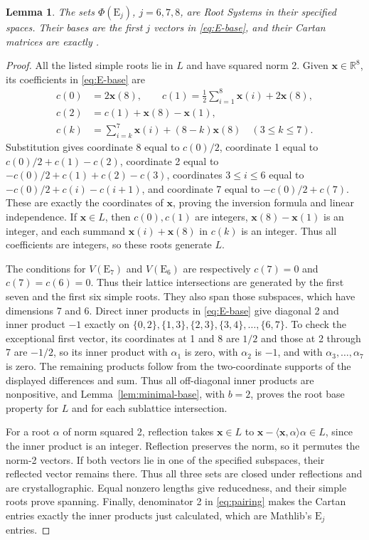 \documentclass[11pt]{amsart}
\newcommand\re{{\mathbb R}}%
\newcommand\Zx{{\mathbf x}}
\newcommand\ip[2]{\langle#1,#2\rangle}
\newtheorem{lemma}[theorem]{Lemma}
\theoremstyle{definition}
\newcommand{\typ}[1]{\mathrm{#1}}
\DeclareRobustCommand{\ml}[1]{\ifmmode\text{\normalfont\small\ttfamily\detokenize{#1}}\else{\normalfont\small\nolinkurl{#1}}\fi}
\begin{document}
\begin{lemma}\label{lem:E}
The sets $\Phi(\typ E_j)$, $j=6,7,8$, are Root Systems in their specified
spaces. Their bases are the first $j$ vectors in \eqref{eq:E-base}, and
their Cartan matrices are exactly \ml{CartanMatrix.E j}.
\end{lemma}
\begin{proof}
All the listed simple roots lie in $L$ and have squared norm 2. Given
$\Zx\in\re^8$, its coefficients in \eqref{eq:E-base} are
\begin{equation}\label{eq:E-coeff}
 \begin{split}
 c(0)&=2\Zx(8),\qquad
 c(1)=\tfrac12\sum_{i=1}^8\Zx(i)+2\Zx(8),\\
 c(2)&=c(1)+\Zx(8)-\Zx(1),\\
 c(k)&=\sum_{i=k}^7\Zx(i)+(8-k)\Zx(8)\quad(3\leq k\leq7).
 \end{split}
\end{equation}
Substitution gives coordinate 8 equal to $c(0)/2$, coordinate 1 equal
to $c(0)/2+c(1)-c(2)$, coordinate 2 equal to
$-c(0)/2+c(1)+c(2)-c(3)$, coordinates $3\leq i\leq6$ equal to
$-c(0)/2+c(i)-c(i+1)$, and coordinate 7 equal to $-c(0)/2+c(7)$.
These are exactly the coordinates of $\Zx$, proving the inversion formula
and linear independence. If $\Zx\in L$, then $c(0),c(1)$ are integers,
$\Zx(8)-\Zx(1)$ is an integer, and each summand
$\Zx(i)+\Zx(8)$ in $c(k)$ is an integer. Thus all coefficients are
integers, so these roots generate $L$.

The conditions for $V(\typ E_7)$ and $V(\typ E_6)$ are respectively
$c(7)=0$ and $c(7)=c(6)=0$. Thus their lattice intersections are
generated by the first seven and the first six simple roots. They also
span those subspaces, which have dimensions 7 and 6. Direct inner products
in \eqref{eq:E-base} give diagonal 2 and inner product $-1$ exactly on
$\{0,2\},\{1,3\},\{2,3\},\{3,4\},\ldots,\{6,7\}$.
To check the exceptional first vector, its coordinates at 1 and 8 are
$1/2$ and those at 2 through 7 are $-1/2$, so its inner product with
$\alpha_1$ is zero, with $\alpha_2$ is $-1$, and with
$\alpha_3,\ldots,\alpha_7$ is zero. The remaining products follow
from the two-coordinate supports of the displayed differences and sum.
Thus all off-diagonal inner products are nonpositive, and
Lemma~\ref{lem:minimal-base}, with $b=2$, proves the root base property
for $L$ and for each sublattice intersection.

For a root $\alpha$ of norm squared 2, reflection takes
$\Zx\in L$ to $\Zx-\ip{\Zx}{\alpha}\alpha\in L$, since the inner
product is an integer. Reflection preserves the norm, so it permutes the
norm-2 vectors. If both vectors lie in one of the specified subspaces,
their reflected vector remains there. Thus all three sets are closed under
reflections and are crystallographic. Equal nonzero lengths give
reducedness, and their simple roots prove spanning. Finally, denominator
2 in \eqref{eq:pairing} makes the Cartan entries exactly the inner products
just calculated, which are Mathlib's $\typ E_j$ entries.
\end{proof}
\end{document}
